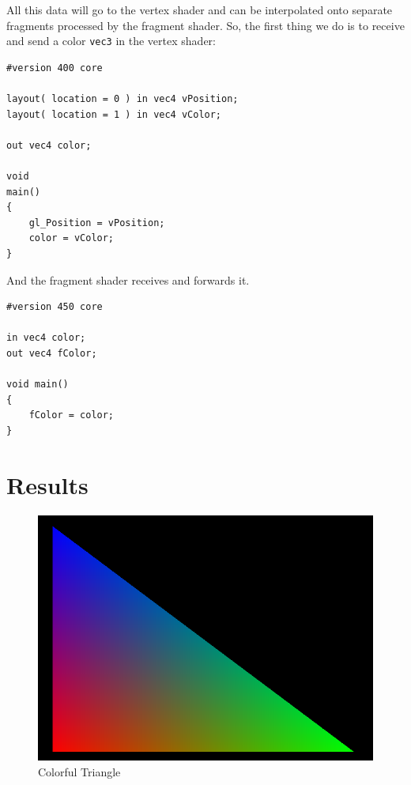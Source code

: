 \documentclass[11pt]{article}
\begin{document}
All this data will go to the vertex shader and can be interpolated onto separate
fragments processed by the fragment shader. So, the first thing we do is to
receive and send a color \texttt{vec3} in the vertex shader:

\begin{verbatim}
#version 400 core

layout( location = 0 ) in vec4 vPosition;
layout( location = 1 ) in vec4 vColor;

out vec4 color;

void
main()
{
    gl_Position = vPosition;
    color = vColor;
}
\end{verbatim}

And the fragment shader receives and forwards it.

\begin{verbatim}
#version 450 core

in vec4 color;
out vec4 fColor;

void main()
{
    fColor = color;
}
\end{verbatim}

\section{Results}
\label{sec:orgf5e9d95}

\begin{figure}[htbp]
\centering
\includegraphics[width=.9\linewidth]{./triangle.png}
\caption{Colorful Triangle}
\end{figure}
\end{document}
